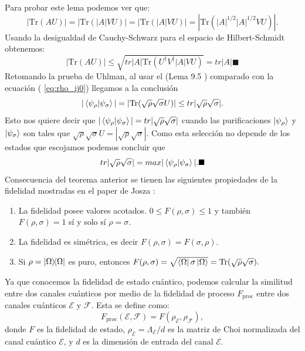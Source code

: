 \documentclass[letterpaper,12pt]{thesisECFM}
\theoremstyle{plain}
\theoremstyle{definition}
\theoremstyle{definition}
\theoremstyle{remark}
\newcommand{\1}{\mathbb{1}}
\begin{document}
    Para probar este lema podemos ver que:
    \begin{equation}
        |\text{Tr}(AU)| = |\text{Tr}(|A|VU)| = \left| \text{Tr}(|A|VU  ) \right| = \left|\text{Tr}(|A|^{1/2}|A|^{1/2} VU )   \right|.
    \end{equation}
    Usando la desigualdad de Cauchy-Schwarz \cite{nielsen_chuang_2011} para el espacio de Hilbert-Schmidt obtenemos:
    \begin{equation}
        |\text{Tr}(AU)| \leq \sqrt{ tr|A| \text{Tr}(U^\dagger V^ \dagger  |A|VU) } = tr|A| \blacksquare  
    \end{equation} 
    Retomando la prueba de Uhlman, al usar el (Lema 9.5 ) comparado con la ecuación ( \ref{eq:rho_ij0})  llegamos a la conclusión
    \begin{equation}
        |\braket{\psi_\rho}{\psi_\sigma}| = |\text{Tr}(\sqrt{\rho} \sqrt{\sigma} U )| \leq tr|\sqrt{\rho} \sqrt{\sigma} |.
    \end{equation}
    Esto nos quiere decir que $|\braket{\psi_\rho}{\psi_\sigma}| = tr| \sqrt{\rho}\sqrt{\sigma}|$ cuando las purificaciones $\ket{\psi_\rho}$ y $\ket{\psi_\sigma}$ son tales que $\sqrt{\rho}\sqrt{\sigma} U = |\sqrt{\rho}\sqrt{\sigma}|$. Como esta selección no depende de los estados que escojamos podemos concluir que
    \begin{equation}
        tr|\sqrt{\rho}\sqrt{\sigma}| = max | \braket{\psi_\rho}{\psi_\sigma}|. \blacksquare
    \end{equation}
    Consecuencia del teorema anterior se tienen las siguientes propiedades de la fidelidad mostradas en el paper de Josza \cite{Jozsa}:
    \begin{enumerate}
        \item La fidelidad posee valores acotados. $0 \leq F(\rho,\sigma) \leq 1$ y también $F(\rho,\sigma)=1 $ sí y solo sí $\rho=\sigma$.
	\item La fidelidad es simétrica, es decir  $F(\rho,\sigma) = F(\sigma,\rho).$
        \item Si $\rho= \ketbra{\Omega}{\Omega}$ es puro, entonces $F(\rho,\sigma)= \sqrt{\bra{\Omega}\sigma \ket{\Omega}} = \text{Tr}(\sqrt{\rho} \sqrt{\sigma}).$
    \end{enumerate}

    
Ya que conocemos la fidelidad de estado cuántico, podemos calcular la similitud entre dos canales cuánticos por medio de la  fidelidad de proceso $F_{\text{proc}}$ entre dos canales cuánticos $\mathcal{E}$ y $\mathcal{F}$. Esta se define como:
\begin{equation} \label{ec:fidel_proc}
F_{\text{proc}}(\mathcal{E}, \mathcal{F}) = F(\rho_{\mathcal{E}}, \rho_{\mathcal{F}}), 
\end{equation}
donde $F$ es la fidelidad de estado,  $\rho_{\mathcal{E}} =  \Lambda_{\mathcal{E}}/d $ es la matriz de Choi normalizada del canal cuántico $\mathcal{E}$, y $d$ es la dimensión de entrada del canal $\mathcal{E}$. 
\end{document}
